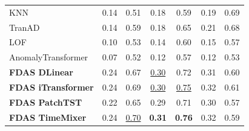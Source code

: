 \documentclass[border=2pt]{standalone}
\begin{document}
\begin{tabular}{l|cccccc}
KNN                    & 0.14 & 0.51 & 0.18 & 0.59 & 0.19 & 0.69 \\
TranAD                 & 0.14 & 0.59 & 0.18 & 0.65 & 0.21 & 0.68 \\
LOF                    & 0.10 & 0.53 & 0.14 & 0.60 & 0.15 & 0.57 \\
AnomalyTransformer     & 0.07 & 0.52 & 0.12 & 0.57 & 0.12 & 0.53 \\
\midrule
\textbf{FDAS DLinear} & 0.24 & 0.67 & \underline{0.30} & 0.72 & 0.31 & 0.60 \\
\textbf{FDAS iTransformer} & 0.24 & 0.69 & \underline{0.30} & \underline{0.75} & 0.32 & 0.61 \\
\textbf{FDAS PatchTST} & 0.22 & 0.65 & 0.29 & 0.71 & 0.30 & 0.57 \\
\textbf{FDAS TimeMixer} & 0.24 & \underline{0.70} & \textbf{0.31} & \textbf{0.76} & 0.32 & 0.59 \\
\bottomrule
\end{tabular}
\end{document}
